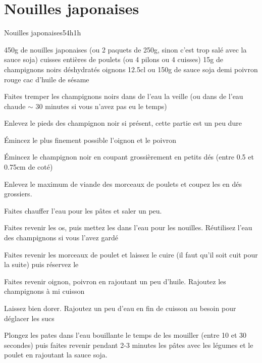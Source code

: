 {\section{Nouilles japonaises}
\begin{recette}{Nouilles japonaises}{5}{4h}{1h}
\begin{ingredients}
\ingredient 450g de nouilles japonaises (ou 2 paquets de 250g, sinon c'est trop salé avec la sauce soja)
 cuisses entières de poulets (ou 4 pilons ou 4 cuisses)
\ingredient 15g de champignons noirs déshydratés
 oignons
\ingredient 12.5cl ou 150g de sauce soja 
 demi poivron rouge
 cac d'huile de sésame
\end{ingredients}

\begin{preparation}
\item Faites tremper les champignons noirs dans de l'eau la veille (ou dans de l'eau chaude $\sim$ 30 minutes si vous n'avez pas eu le 
temps)
\begin{remarque}
Enlevez le pieds des champignon noir si présent, cette partie est un peu dure
\end{remarque}

\item Émincez le plus finement possible l'oignon et le poivron
\item Émincez le champignon noir en coupant grossièrement en petits dés (entre 0.5 et 0.75cm de coté)
\item Enlevez le maximum de viande des morceaux de poulets et coupez les en dés grossiers. 
\item Faites chauffer l'eau pour les pâtes et saler un peu.
\item Faites revenir les os, puis mettez les dans l'eau pour les nouilles. Réutilisez l'eau des champignons si vous l'avez gardé
\item Faites revenir les morceaux de poulet et laissez le cuire (il faut 
qu'il soit cuit pour la suite) puis réservez le
\item Faites revenir oignon, poivron en rajoutant un peu d'huile. Rajoutez les champignons à mi cuisson
\item Laissez bien dorer. Rajoutez un peu d'eau en fin de cuisson au besoin pour déglacer les sucs
\item Plongez les pates dans l'eau bouillante le temps de les mouiller (entre 10 et 30 secondes) puis faites revenir pendant 2-3 minutes les pâtes avec les 
légumes et le poulet en rajoutant la sauce soja.
\end{preparation}
\end{recette}

}
